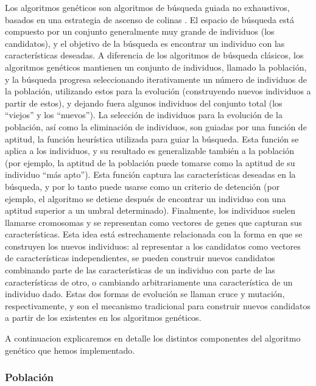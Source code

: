 Los algoritmos genéticos \cite{Goldberg:1989} son algoritmos de búsqueda guiada no exhaustivos, 
basados en una estrategia de ascenso de colinas \cite{Russell:2009}. El espacio de búsqueda está 
compuesto por un conjunto generalmente muy grande de individuos (los candidatos), y
el objetivo de la búsqueda es encontrar un individuo con las características deseadas. 
A diferencia de los algoritmos de búsqueda clásicos, los algoritmos genéticos mantienen un conjunto de individuos,
llamado la población, y la búsqueda progresa seleccionando iterativamente un número de individuos de la población, 
utilizando estos para la evolución (construyendo nuevos individuos a partir de estos), 
y dejando fuera algunos individuos del conjunto total (los ``viejos'' y los ``nuevos'').
La selección de individuos para la evolución de la población, así como la eliminación de individuos, 
son guiadas por una función de aptitud, la función heurística utilizada para guiar la búsqueda. 
Esta función se aplica a los individuos, y su resultado es generalizable también a la población 
(por ejemplo, la aptitud de la población puede tomarse como la aptitud de su individuo ``más apto'').
Esta función captura las características deseadas en la búsqueda, y por lo tanto puede usarse como un 
criterio de detención (por ejemplo, el algoritmo se detiene después de encontrar un individuo con una 
aptitud superior a un umbral determinado). Finalmente, los individuos suelen llamarse cromosomas y 
se representan como vectores de genes que capturan sus características. Esta idea está estrechamente relacionada 
con la forma en que se construyen los nuevos individuos: al representar a los candidatos como vectores de 
características independientes, se pueden construir nuevos candidatos combinando parte de las características 
de un individuo con parte de las características de otro, o cambiando arbitrariamente una característica de 
un individuo dado. Estas dos formas de evolución se llaman cruce y mutación, respectivamente, y son el 
mecanismo tradicional para construir nuevos candidatos a partir de los existentes en los algoritmos genéticos. 

A continuacion explicaremos en detalle los distintos componentes del algoritmo genético que hemos implementado.

\subsubsection{Población}

